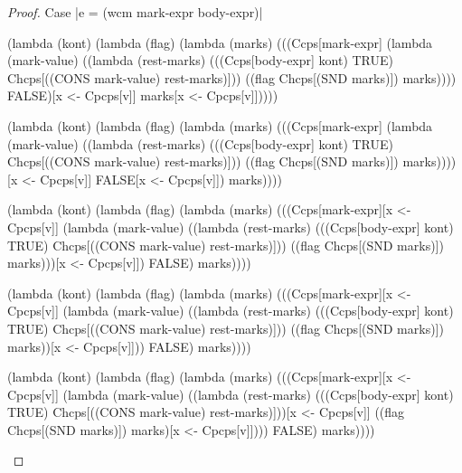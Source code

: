 \begin{proof}{Case \scheme|e = (wcm mark-expr body-expr)|}
\begin{schemeblock}
\begin{schemedisplay}
(lambda (kont)
  (lambda (flag)
    (lambda (marks)
      (((Ccps[mark-expr]
          (lambda (mark-value) 
            ((lambda (rest-marks) 
               (((Ccps[body-expr] kont) TRUE) Chcps[((CONS mark-value) rest-marks)]))
             ((flag Chcps[(SND marks)]) marks))))
        FALSE)[x <- Cpcps[v]] marks[x <- Cpcps[v]]))))
\end{schemedisplay}
\end{schemeblock}

\begin{schemeblock}
\begin{schemedisplay}
(lambda (kont)
  (lambda (flag)
    (lambda (marks)
      (((Ccps[mark-expr]
          (lambda (mark-value) 
            ((lambda (rest-marks) 
               (((Ccps[body-expr] kont) TRUE) Chcps[((CONS mark-value) rest-marks)]))
             ((flag Chcps[(SND marks)]) marks))))[x <- Cpcps[v]]
        FALSE[x <- Cpcps[v]]) marks))))
\end{schemedisplay}
\end{schemeblock}

\begin{schemeblock}
\begin{schemedisplay}
(lambda (kont)
  (lambda (flag)
    (lambda (marks)
      (((Ccps[mark-expr][x <- Cpcps[v]]
          (lambda (mark-value) 
            ((lambda (rest-marks) 
               (((Ccps[body-expr] kont) TRUE) Chcps[((CONS mark-value) rest-marks)]))
             ((flag Chcps[(SND marks)]) marks)))[x <- Cpcps[v]])
        FALSE) marks))))
\end{schemedisplay}
\end{schemeblock}

\begin{schemeblock}
\begin{schemedisplay}
(lambda (kont)
  (lambda (flag)
    (lambda (marks)
      (((Ccps[mark-expr][x <- Cpcps[v]]
          (lambda (mark-value) 
            ((lambda (rest-marks) 
               (((Ccps[body-expr] kont) TRUE) Chcps[((CONS mark-value) rest-marks)]))
             ((flag Chcps[(SND marks)]) marks))[x <- Cpcps[v]]))
        FALSE) marks))))
\end{schemedisplay}
\end{schemeblock}

\begin{schemeblock}
\begin{schemedisplay}
(lambda (kont)
  (lambda (flag)
    (lambda (marks)
      (((Ccps[mark-expr][x <- Cpcps[v]]
          (lambda (mark-value) 
            ((lambda (rest-marks) 
               (((Ccps[body-expr] kont) TRUE) Chcps[((CONS mark-value) rest-marks)]))[x <- Cpcps[v]]
             ((flag Chcps[(SND marks)]) marks)[x <- Cpcps[v]])))
        FALSE) marks))))
\end{schemedisplay}
\end{schemeblock}


\end{proof}
